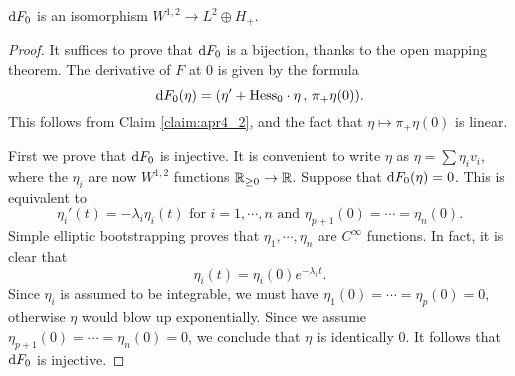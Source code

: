 \begin{prop} $\mathrm{d} F_{0}$ is an isomorphism $W^{1,2}\to L^{2}\oplus H_{+}$.
\end{prop}
\begin{proof}
  It suffices to prove that $\mathrm{d} F_{0}$ is a bijection, thanks to the open mapping theorem. The derivative of $F$ at $0$ is given by the formula
  \begin{equation*}
    \mathrm{d} F_{0}(\eta)=(\eta'+\text{Hess}_{0}\cdot \eta\,,\,\pi_{+}\eta(0)).
  \end{equation*}
  This follows from Claim \ref{claim:apr4_2}, and the fact that $\eta\mapsto \pi_{+}\eta(0)$ is linear.

  First we prove that $\mathrm{d} F_{0}$ is injective. It is convenient to write $\eta$ as $\eta=\sum \eta_{i}v_{i}$, where the $\eta_{i}$ are now $W^{1,2}$ functions $\mathbb{R}_{\ge 0}\to \mathbb{R}$. Suppose that $\mathrm{d} F_{0}(\eta)=0$. This is equivalent to
  \begin{equation*}
    \eta_{i}'(t)=-\lambda_{i}\eta_{i}(t)\text{ for $i=1,\cdots,n$}\text{ and }\eta_{p+1}(0)=\cdots=\eta_{n}(0).
  \end{equation*}
  Simple elliptic bootstrapping proves that $\eta_{1},\cdots,\eta_{n}$ are $C^{\infty}$ functions. In fact, it is clear that
  \begin{equation*}
    \eta_{i}(t)=\eta_{i}(0)e^{-\lambda_{i}t}.
  \end{equation*}
  Since $\eta_{i}$ is assumed to be integrable, we must have $\eta_{1}(0)=\cdots=\eta_{p}(0)=0$, otherwise $\eta$ would blow up exponentially. Since we assume $\eta_{p+1}(0)=\cdots=\eta_{n}(0)=0$, we conclude that $\eta$ is identically $0$. It follows that $\mathrm{d} F_{0}$ is injective. 
  

\end{proof}
